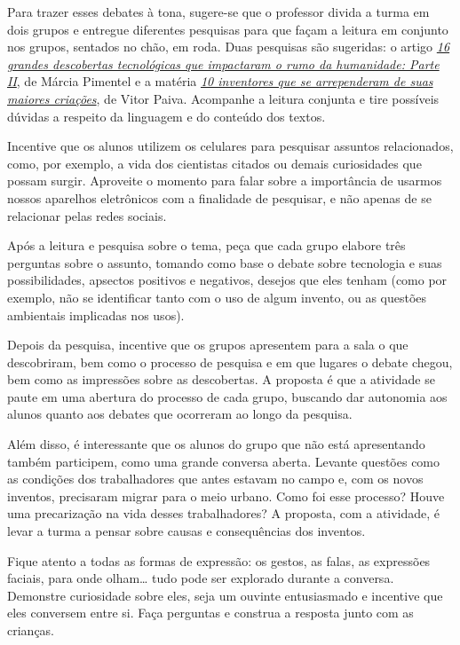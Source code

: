 \documentclass[11pt]{extarticle}
\begin{document}
Para trazer esses debates à tona, sugere-se que o professor divida a turma em dois grupos e entregue diferentes pesquisas para que façam a leitura em conjunto nos grupos, sentados no chão, em roda. Duas pesquisas são sugeridas: o artigo \href{http://multirio.rio.rj.gov.br/index.php/leia/reportagens-artigos/reportagens/16755-16-grandes-descobertas-tecnol\%C3\%B3gicas-que-impactaram-o-rumo-da-humanidade-parte-ii}{\textit{16 grandes descobertas tecnológicas que impactaram o rumo da humanidade: Parte II}}, de Márcia Pimentel e a matéria \href{https://www.hypeness.com.br/2017/03/selecao-hypeness-10-inventores-que-se-arrependeram-de-suas-maiores-criacoes/}{\textit{10 inventores que se arrependeram de suas maiores criações}}, de Vitor Paiva. Acompanhe a leitura conjunta e tire possíveis dúvidas a respeito da linguagem  e do conteúdo dos textos. 

Incentive que os alunos utilizem os celulares para pesquisar assuntos relacionados, como, por exemplo, a vida dos cientistas citados ou demais curiosidades que possam surgir. Aproveite o momento para falar sobre a importância de usarmos nossos aparelhos eletrônicos com a finalidade de pesquisar, e não apenas de se relacionar pelas redes sociais. 

Após a leitura e pesquisa sobre o tema, peça que cada grupo elabore três perguntas sobre o assunto, tomando como base o debate sobre tecnologia e suas possibilidades, apsectos positivos e negativos, desejos que eles tenham (como por exemplo, não se identificar tanto com o uso de algum invento, ou as questões ambientais implicadas nos usos). 

Depois da pesquisa, incentive que os grupos apresentem para a sala o que descobriram, bem como o processo de pesquisa e em que lugares o debate chegou, bem como as impressões sobre as descobertas. A proposta é que a atividade se paute em uma abertura do processo de cada grupo, buscando dar autonomia aos alunos quanto aos debates que ocorreram ao longo da pesquisa. 

Além disso, é interessante que os alunos do grupo que não está apresentando também participem, como uma grande conversa aberta. Levante questões como as condições dos trabalhadores que antes estavam no campo e, com os novos inventos, precisaram migrar para o meio urbano. Como foi esse processo? Houve uma precarização na vida desses trabalhadores? A proposta, com a atividade, é levar a turma a pensar sobre causas e consequências dos inventos. 

Fique atento a todas as formas de expressão: os gestos, as falas, as 
expressões faciais, para onde olham\ldots{} tudo pode ser explorado durante a conversa. 
Demonstre curiosidade sobre eles, seja um ouvinte entusiasmado e incentive que eles 
conversem entre si. Faça perguntas e construa a resposta junto com as crianças. 
\end{document}
